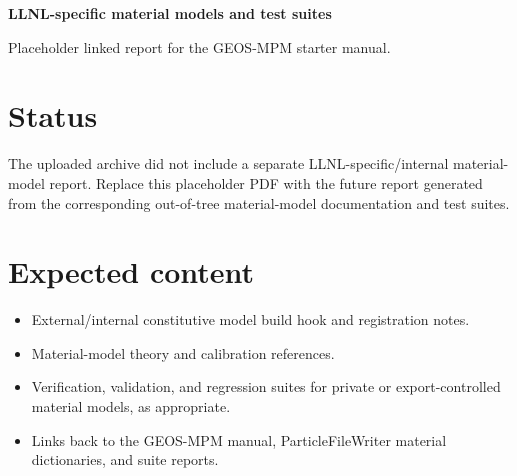 \documentclass[11pt]{article}
\begin{document}
\begin{center}
{\Large\bfseries LLNL-specific material models and test suites}\par
\vspace{1em}
Placeholder linked report for the GEOS-MPM starter manual.
\end{center}
\section*{Status}
The uploaded archive did not include a separate LLNL-specific/internal material-model report. Replace this placeholder PDF with the future report generated from the corresponding out-of-tree material-model documentation and test suites.
\section*{Expected content}
\begin{itemize}
\item External/internal constitutive model build hook and registration notes.
\item Material-model theory and calibration references.
\item Verification, validation, and regression suites for private or export-controlled material models, as appropriate.
\item Links back to the GEOS-MPM manual, ParticleFileWriter material dictionaries, and suite reports.
\end{itemize}
\end{document}

